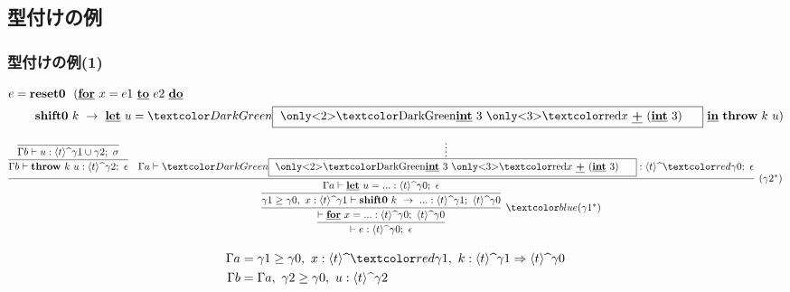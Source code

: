 
\subsection{型付けの例}

\newcommand\boxterm{\framebox{
    \only<2>{\green{$\cint{3}$}}
    \only<3>{\red{$x~\cPlus~(\cint{3})$}}
    \phantom{A}
  }}

\begin{frame}
  \frametitle{型付けの例(1)}
  \begin{align*}
    e & = \Resetz ~~(\cfordo{x = e1}{e2} \\
      & \phantom{=}~~~ \Shiftz~k~\to~
        {\cLet~u=\green{\boxterm}~\cIn}~\Throw~k~u)
  \end{align*}

  \[
    \infer{\vdash e : \codeTs{t}{\gamma0};~\epsilon}
    {\infer[\blue{(\gamma1^*)}]{\vdash \cfor{x=...} :
        \codeTs{t}{\gamma0};~\codeTs{t}{\gamma0}}
      {\infer{\gamma1 \ord \gamma0,~x:\codeTs{t}{\gamma1}
          \vdash \Shiftz~k~\to~... :
          \codeTs{t}{\gamma1};~\codeTs{t}{\gamma0}}
        {\infer[(\gamma2^*)]{\Gamma a \vdash \cLet~u=...:\codeTs{t}{\gamma0};~\epsilon}
          {\infer{\Gamma b \vdash
              \Throw~k~u:\codeTs{t}{\gamma2};~\epsilon }
            {\infer{\Gamma b \vdash
                u:\codeTs{t}{\gamma1 \cup \gamma2};~ \sigma}
              {}
            }
            &\infer*{\Gamma a \vdash
              \green{\boxterm}:\codeTs{t}{\red{\gamma0}};~\epsilon}
            {}
          }
        }
      }
    }
  \]


  {\footnotesize
    \begin{align*}
      \Gamma a &= \gamma1 \ord \gamma0,~x:\codeTs{t}{\red{\gamma1}},
                 ~k: \contT{\codeTs{t}{\gamma1}}{\codeTs{t}{\gamma0}} \\
      \Gamma b &= \Gamma a,~\gamma2 \ord \gamma0,~u:\codeTs{t}{\gamma2}
    \end{align*}
  }

\end{frame}


